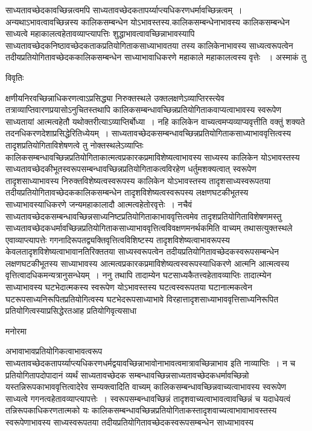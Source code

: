 \documentclass[10pt, openany]{book}
\begin{document}
{साध्यतावच्छेदकावच्छिन्नत्वमपि साध्यतावच्छेदकतापर्य्याप्त्यधिकरणधर्मावच्छिन्नत्वम्~। अन्यथाऽभावत्वावच्छिन्नस्य कालिकसम्बन्धेन योऽभावस्तस्य.कालिकसम्बन्धेनाभावस्य
कालिकसम्बन्धेन साध्यत्वे महाकालत्वहेतावव्याप्त्यापत्तिः शुद्धाभावत्वावच्छिन्नाभावस्यापि साध्यतावच्छेदकनिष्ठावच्छेदकताकप्रतियोगिताकसाध्याभावतया तस्य कालिकेनाभावस्य साध्यत्वरूपत्वेन तदीयप्रतियोगितावच्छेदककालिकसम्बन्धेन साध्याभावाधिकरणे महाकाले महाकालत्वस्य वृत्तेः ~। अस्माकं तु
\newpage
\begin{center}     विवृतिः \end{center}
क्षणीयनिरवच्छिन्नाधिकरणत्वाऽप्रसिद्ध्या निरुक्तस्थले उक्तलक्षणेऽव्याप्तिरस्त्येव तत्राव्याप्तिवारणप्रयासोऽनुचितस्तथापि कालिकसम्बन्धावच्छिन्नप्रतियोगिताकवाप्यत्वाभावस्य स्वरूपेण साध्यतायां आत्मत्वहेतौ यथोक्तरीत्याऽव्याप्तिर्बोध्या~। नहि कालिकेन वाच्यत्वमप्यव्याप्यवृत्तीति वक्तुं शक्यते तदनधिकरणदेशाप्रसिद्धेरितिध्येयम्~।
साध्यतावच्छेदकसम्बन्धावच्छिन्नप्रतियोगिताकसाध्याभाववृत्तित्वस्य तादृशप्रतियोगिताविशेषणत्वे तु नोक्तस्थलेऽव्याप्तिः
कालिकसम्बन्धावच्छिन्नप्रतियोगिताकात्मत्वप्रकारकप्रमाविशेष्यत्वाभावस्य साध्यस्य कालिकेन योऽभावस्तस्य साध्यतावच्छेदकीभूतस्वरूपसम्बन्धावच्छिन्नप्रतियोगिताकत्वविरहेण धर्तुमशक्यत्वात् स्वरूपेण तादृशसाध्याभावस्य निरुक्तविशेष्यत्वस्वरूपस्य कालिकेन योऽभावस्तस्य
तादृशसाध्यस्वरूपतया तदीयप्रतियोगितावच्छेदककालिकसम्बन्धेन तादृशविशेष्यत्वस्वरूपस्य लक्षणघटकीभूतस्य साध्याभावस्याधिकरणे जन्यमहाकालादौ आत्मत्वहेतोरवृत्तेः~। नचैवं साध्यतावच्छेदकसम्बन्धावच्छिन्नसाध्यनिष्टप्रतियोगिताकाभाववृत्तित्वमेव तादृशप्रतियोगिताविशेषणमस्तु
साध्यतावच्छेदकधर्मावच्छिन्नप्रतियोगिताकसाध्याभाववृत्तित्वविवक्षणमनर्थकमिति वाच्यम् तथासत्युक्तस्थले एवाव्याप्त्यापत्तेः गगनादिरूपतद्व्यक्तिवृत्तित्वविशिष्टस्य
तादृशविशेष्यत्वाभावरूपस्य केवलतादृशविशेष्यत्वाभावानतिरिक्ततया साध्यस्वरूपत्वेन तदीयप्रतियोगितावच्छेदकस्वरूपसम्बन्धेन लक्षणघटकीभूतस्य साध्याभावस्य
आत्मत्वप्रकारकप्रमाविशेष्यत्वस्वरूपस्याधिकरणे आत्मनि आत्मत्वस्य वृत्तित्वादधिकमन्यत्रानुसन्धेयम्~। ननु तथापि तादाम्येन घटसाध्यकैतत्त्वहेतावव्याप्तिः तादात्म्येन साध्याभावस्य घटभेदात्मकस्य स्वरूपेण योऽभावस्तस्य घटत्वस्वरूपतया घटानात्मकत्वेन घटरूपसाध्यनिरूपितप्रतियोगित्वस्य घटभेदरूपसाध्याभावे विरहात्तादृशसाध्याभाववृत्तिसाध्यनिरूपित प्रतियोगित्वस्याप्रसिद्धेरतआह प्रतियोगिवृत्यसाधा
\begin{center}   मनोरमा  \end{center}
अभावाभावप्रतियोगिकत्वाभावत्वरूप साध्यतावच्छेदकतापर्य्याप्त्यधिकरणधर्मद्वयावच्छिन्नाभावोनाभावत्वमात्रावच्छिन्नाभाव इति नाव्याप्तिः~। न च प्रतियोगितापदोपादानं
व्यर्थं साध्यतावच्छेदक सम्बन्धावच्छिन्नसाध्यतावच्छेदकधर्मावच्छिन्नो यस्तन्निरूपकाभाववृत्तित्वादेरेव सम्यक्त्वादिति वाच्यम् कालिकसम्बन्धावच्छिन्नवाच्यत्वाभावस्य स्वरूपेण साध्यत्वे गगनत्वहेतावव्याप्त्यापत्तेः~। स्वरूपसम्बन्धावच्छिन्नं तादृशवाच्यत्वाभावत्वावच्छिन्नं च यदाधेयत्वं तन्निरूपकाधिकरणतात्मको यः कालिकसम्बन्धावच्छिन्नप्रतियोगिताकस्तादृशवाच्यत्वाभावाभावस्तस्य स्वरूपेणाभावस्य साध्यस्वरूपतया तदीयप्रतियोगितावच्छेदकस्वरूपसम्बन्धेन साध्याभावस्य
}
\end{document}
